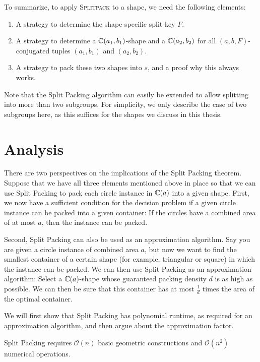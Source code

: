 \documentclass[a4paper,style=print,bibliography=totoc,nexus,lnum,extramargin]{tubsbook}
\begin{document}
To summarize, to apply \textsc{Splitpack} to a shape, we need the following elements:

\begin{enumerate}
    \item A strategy to determine the shape-specific split key $F$.
    \item A strategy to determine a $\mathbb{C}(a_1, b_1)$-shape and a $\mathbb{C}(a_2, b_2)$ for all $(a,b,F)$-conjugated tuples $(a_1, b_1)$ and $(a_2, b_2)$.
    \item A strategy to pack these two shapes into $s$, and a proof why this always works.
\end{enumerate}

Note that the Split Packing algorithm can easily be extended to allow splitting into more than two subgroups. For simplicity, we only describe the case of two subgroups here, as this suffices for the shapes we discuss in this thesis.

\section{Analysis}

There are two perspectives on the implications of the Split Packing theorem. Suppose that we have all three elements mentioned above in place so that we can use Split Packing to pack each circle instance in $\mathbb{C}(a)$ into a given shape.
First, we now have a sufficient condition for the decision problem if a given circle instance can be packed into a given container: If the circles have a combined area of at most $a$, then the instance can be packed.

Second, Split Packing can also be used as an approximation algorithm. Say you are given a circle instance of combined area $a$, but now we want to find the smallest container of a certain shape (for example, triangular or square) in which the instance can be packed. We can then use Split Packing as an approximation algorithm: Select a $\mathbb{C}(a)$-shape whose guaranteed packing density $d$ is as high as possible. We can then be sure that this container has at most $\frac{1}{d}$ times the area of the optimal container.

We will first show that Split Packing has polynomial runtime, as required for an approximation algorithm, and then argue about the approximation factor.

\begin{theorem}
    Split Packing requires $\mathcal{O}(n)$ basic geometric constructions and $\mathcal{O}(n^2)$ numerical operations.
\end{theorem}
\end{document}
